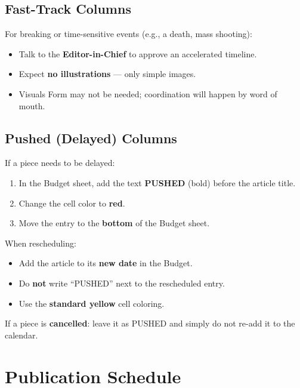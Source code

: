 \documentclass[12pt]{article}
\begin{document}
\subsection{Fast-Track Columns}

For breaking or time-sensitive events (e.g., a death, mass shooting):

\begin{itemize}
    \item Talk to the \textbf{Editor-in-Chief} to approve an accelerated timeline.
    \item Expect \textbf{no illustrations} --- only simple images.
    \item Visuals Form may not be needed; coordination will happen by word of mouth.
\end{itemize}

\subsection{Pushed (Delayed) Columns}

If a piece needs to be delayed:

\begin{enumerate}
    \item In the Budget sheet, add the text \textbf{PUSHED} (bold) before the article title.
    \item Change the cell color to \textbf{red}.
    \item Move the entry to the \textbf{bottom} of the Budget sheet.
\end{enumerate}

When rescheduling:

\begin{itemize}
    \item Add the article to its \textbf{new date} in the Budget.
    \item Do \textbf{not} write ``PUSHED'' next to the rescheduled entry.
    \item Use the \textbf{standard yellow} cell coloring.
\end{itemize}

If a piece is \textbf{cancelled}: leave it as PUSHED and simply do not re-add it to the calendar.

\section{Publication Schedule}
\end{document}
